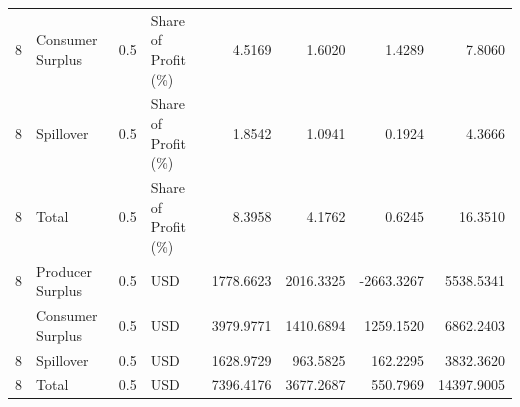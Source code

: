 \begin{table}
\begin{tabular}[t]{rlrlrrrr}
8 & Consumer Surplus & 0.5 & Share of Profit (\%) & 4.5169 & 1.6020 & 1.4289 & 7.8060\\
8 & Spillover & 0.5 & Share of Profit (\%) & 1.8542 & 1.0941 & 0.1924 & 4.3666\\
8 & Total & 0.5 & Share of Profit (\%) & 8.3958 & 4.1762 & 0.6245 & 16.3510\\
8 & Producer Surplus & 0.5 & USD & 1778.6623 & 2016.3325 & -2663.3267 & 5538.5341\\
\addlinespace
8 & Consumer Surplus & 0.5 & USD & 3979.9771 & 1410.6894 & 1259.1520 & 6862.2403\\
8 & Spillover & 0.5 & USD & 1628.9729 & 963.5825 & 162.2295 & 3832.3620\\
8 & Total & 0.5 & USD & 7396.4176 & 3677.2687 & 550.7969 & 14397.9005\\
\bottomrule
\end{tabular}
\end{table}
